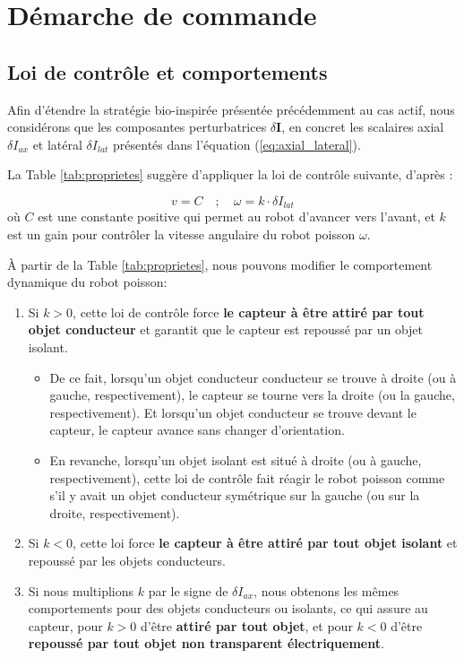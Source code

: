 \section{Démarche de commande} 
\subsection{Loi de contrôle et comportements} \label{sec:controle}
Afin d'étendre la stratégie bio-inspirée présentée précédemment au cas actif, nous considérons que les composantes perturbatrices $\delta \mathbf{I}$, en concret les scalaires axial $\delta I_{ax}$ et latéral $\delta I_{lat}$ présentés dans l'équation (\ref{eq:axial_lateral}).

La Table \ref{tab:proprietes} suggère d'appliquer la loi de contrôle suivante, d'après \cite{Boyer2013}: 

\begin{equation}
    v = C \quad ; \quad \omega = k \cdot \delta I_{lat}
\end{equation}
où $C$ est une constante positive qui permet au robot d'avancer vers l'avant, et $k$ est un gain pour contrôler la vitesse angulaire du robot poisson $\omega$. 

À partir de la Table \ref{tab:proprietes}, nous pouvons modifier le comportement dynamique du robot poisson: 
\begin{enumerate} [label=(\alph*), ref=(3.1.\alph*)]
    \item Si $k > 0$, cette loi de contrôle force \textbf{le capteur à être attiré par tout objet conducteur} et garantit que le capteur est repoussé par un objet isolant. \label{item:a}
    \begin{itemize}
        \item De ce fait, lorsqu'un objet conducteur conducteur se trouve à droite (ou à gauche, respectivement), le capteur se tourne vers la droite (ou la gauche, respectivement). Et lorsqu'un objet conducteur se trouve devant le capteur, le capteur avance sans changer d'orientation.
        \item En revanche, lorsqu'un objet isolant est situé à droite (ou à gauche, respectivement), cette loi de contrôle fait réagir le robot poisson comme s'il y avait un objet conducteur symétrique sur la gauche (ou sur la droite, respectivement).
    \end{itemize}
    \item \label{item:b} Si $k < 0$, cette loi force \textbf{le capteur à être attiré par tout objet isolant} et repoussé par les objets conducteurs. 
    \vspace{0.5cm}
    \item Si nous multiplions $k$ par le signe de $\delta I_{ax}$, nous obtenons les mêmes comportements pour des objets conducteurs ou isolants, ce qui assure au capteur, pour $k > 0$ d'être \textbf{attiré par tout objet}, et pour $k < 0$ d'être \textbf{repoussé par tout objet non transparent électriquement}. \label{item:c}
\end{enumerate}
\newpage
